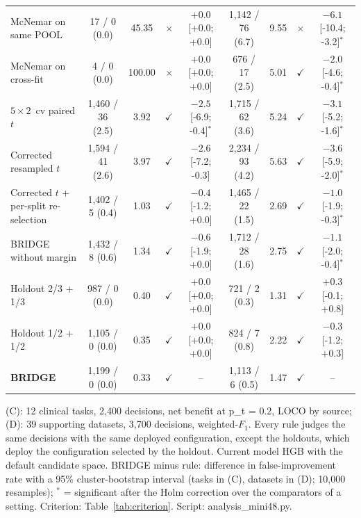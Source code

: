 \begin{table}[!t]
\begin{tabular}{@{}lcccccccc@{}}
McNemar on same POOL & 17 / 0 (0.0) & 45.35 & $\times$ & $+0.0$ [+0.0; +0.0] & 1,142 / 76 (6.7) & 9.55 & $\times$ & $-6.1$ [-10.4; -3.2]$^{*}$ \\
McNemar on cross-fit & 4 / 0 (0.0) & 100.00 & $\times$ & $+0.0$ [+0.0; +0.0] & 676 / 17 (2.5) & 5.01 & $\checkmark$ & $-2.0$ [-4.6; -0.4]$^{*}$ \\
$5\times2$~cv paired $t$ & 1,460 / 36 (2.5) & 3.92 & $\checkmark$ & $-2.5$ [-6.9; -0.4]$^{*}$ & 1,715 / 62 (3.6) & 5.24 & $\checkmark$ & $-3.1$ [-5.2; -1.6]$^{*}$ \\
Corrected resampled $t$ & 1,594 / 41 (2.6) & 3.97 & $\checkmark$ & $-2.6$ [-7.2; -0.3] & 2,234 / 93 (4.2) & 5.63 & $\checkmark$ & $-3.6$ [-5.9; -2.0]$^{*}$ \\
Corrected $t$ + per-split re-selection & 1,402 / 5 (0.4) & 1.03 & $\checkmark$ & $-0.4$ [-1.2; +0.0] & 1,465 / 22 (1.5) & 2.69 & $\checkmark$ & $-1.0$ [-1.9; -0.3]$^{*}$ \\
BRIDGE without margin & 1,432 / 8 (0.6) & 1.34 & $\checkmark$ & $-0.6$ [-1.9; +0.0] & 1,712 / 28 (1.6) & 2.75 & $\checkmark$ & $-1.1$ [-2.0; -0.4]$^{*}$ \\
Holdout 2/3 + 1/3 & 987 / 0 (0.0) & 0.40 & $\checkmark$ & $+0.0$ [+0.0; +0.0] & 721 / 2 (0.3) & 1.31 & $\checkmark$ & $+0.3$ [-0.1; +0.8] \\
Holdout 1/2 + 1/2 & 1,105 / 0 (0.0) & 0.35 & $\checkmark$ & $+0.0$ [+0.0; +0.0] & 824 / 7 (0.8) & 2.22 & $\checkmark$ & $-0.3$ [-1.2; +0.3] \\
\textbf{BRIDGE} & 1,199 / 0 (0.0) & 0.33 & $\checkmark$ & -- & 1,113 / 6 (0.5) & 1.47 & $\checkmark$ & -- \\
\bottomrule
\end{tabular}

\vspace{2pt}
\parbox{\linewidth}{\justifying\scriptsize *(C): 12 clinical tasks, 2,400 decisions, net benefit at p\_t = 0.2, LOCO by source; (D): 39 supporting datasets, 3,700 decisions, weighted-$F_1$. Every rule judges the same decisions with the same deployed configuration, except the holdouts, which deploy the configuration selected by the holdout. Current model HGB with the default candidate space. BRIDGE minus rule: difference in false-improvement rate with a 95\% cluster-bootstrap interval (tasks in (C), datasets in (D); 10,000 resamples); $^{*}$ = significant after the Holm correction over the comparators of a setting. Criterion: Table~\ref{tab:criterion}. Script: analysis\_mini48.py.}
\end{table}
